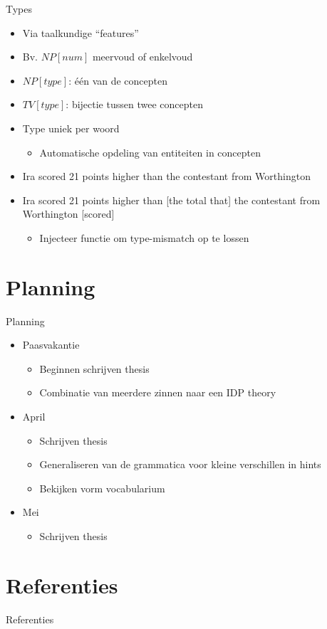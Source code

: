\documentclass[notes, dvipsnames]{beamer}
\newcommand{\seperation}{
	\vspace{1em}
	\ppause
}
\newcommand{\hitem}{
	\ppause
	\item
}
\newcommand{\ppause}{\onslide<+>}
\begin{document}
	\begin{frame}{Types}
    \begin{itemize}
      \hitem Via taalkundige ``features''
      \item Bv. $NP[num]$ meervoud of enkelvoud
      \hitem $NP[type]$: één van de concepten
      \item $TV[type]$: bijectie tussen twee concepten
      \hitem Type uniek per woord
      \begin{itemize}
        \item Automatische opdeling van entiteiten in concepten
      \end{itemize}

      \seperation
      \item Ira scored 21 points higher than the contestant from Worthington
      \hitem Ira scored 21 points higher than [the total that] the contestant from Worthington [scored]
      \begin{itemize}
          \item Injecteer functie om type-mismatch op te lossen
      \end{itemize}
    \end{itemize}
	\end{frame}

  \section{Planning}
  \begin{frame}{Planning}
			\begin{itemize}
        \hitem Paasvakantie
          \begin{itemize}
            \item Beginnen schrijven thesis
            \item Combinatie van meerdere zinnen naar een IDP theory
          \end{itemize}
        \hitem April
          \begin{itemize}
            \item Schrijven thesis
            \item Generaliseren van de grammatica voor kleine verschillen in hints
            \item Bekijken vorm vocabularium
          \end{itemize}
        \hitem Mei
          \begin{itemize}
            \item Schrijven thesis
          \end{itemize}
			\end{itemize}
  \end{frame}
			
	\section{Referenties}
	\begin{frame}[allowframebreaks]{Referenties}
		
		
	\end{frame}
	
\end{document}
